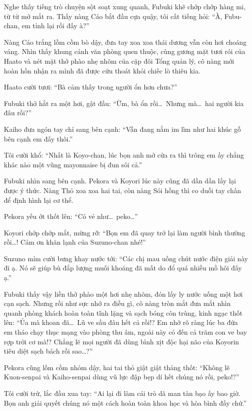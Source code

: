 \documentclass[../main.tex]{subfiles}
\begin{document}
Nghe thấy tiếng trò chuyện sột soạt xung quanh, Fubuki khẽ chớp chớp hàng mi, từ từ mở mắt ra. Thấy nàng Cáo bắt đầu cựa quậy, tôi cất tiếng hỏi: ``À, Fubu-chan, em tỉnh lại rồi đấy à?''

Nàng Cáo trắng lồm cồm bò dậy, đưa tay xoa xoa thái dương vẫn còn hơi choáng váng. Nhìn thấy khung cảnh văn phòng quen thuộc, cùng gương mặt tươi rói của Haato và nét mặt thở phào nhẹ nhõm của cặp đôi Tổng quản lý, cô nàng mới hoàn hồn nhận ra mình đã được cứu thoát khỏi chiếc lò thiêu kia.

Haato cười tươi: ``Bà cảm thấy trong người ổn hơn chưa?''

Fubuki thở hắt ra một hơi, gật đầu: ``Ừm, bà ổn rồi\dots\ Nhưng mà\dots\ hai người kia đâu rồi?''

Kaiho đưa ngón tay chỉ sang bên cạnh: ``Vẫn đang nằm im lìm như hai khúc gỗ bên cạnh em đấy thôi.''

Tôi cười khổ: ``Nhất là Koyo-chan, lúc bọn anh mở cửa ra thì trông em ấy chẳng khác nào một vũng mayonnaise bị đun sôi cả.''

Fubuki nhìn sang bên cạnh. Pekora và Koyori lúc này cũng đã dần dần lấy lại được ý thức. Nàng Thỏ xoa xoa hai tai, còn nàng Sói hồng thì co duỗi tay chân để định hình lại cơ thể.

Pekora yếu ớt thốt lên: ``Có vẻ như\dots\ peko\dots''

Koyori chớp chớp mắt, mừng rỡ: ``Bọn em đã quay trở lại làm người bình thường rồi\dots! Cảm ơn khăn lạnh của Suzuno-chan nhé!''

Suzuno mỉm cười bưng khay nước tới: ``Các chị mau uống chút nước điện giải này đi ạ. Nó sẽ giúp bù đắp lượng muối khoáng đã mất do đổ quá nhiều mồ hôi đấy ạ.''

Fubuki thấy vậy liền thở phào một hơi nhẹ nhõm, đón lấy ly nước uống một hơi cạn sạch. Nhưng rồi như sực nhớ ra điều gì, cô nàng tròn mắt đưa mắt nhìn quanh phòng khách hoàn toàn tĩnh lặng và sạch bóng côn trùng, kinh ngạc thốt lên: ``Ủa mà khoan đã\dots\ Lũ ve sầu đâu hết cả rồi!? Em nhớ rõ ràng lúc ba đứa em tháo chạy thục mạng vào phòng thu âm, ngoài này có đến cả trăm con ve bay rợp trời cơ mà!? Chẳng lẽ mọi người đã dùng bình xịt độc hại não của Koyorin tiêu diệt sạch bách rồi sao\dots?''

Pekora cũng lồm cồm nhỏm dậy, hai tai thỏ giật giật thảng thốt: ``Không lẽ Kuon-senpai và Kaiho-senpai dùng vũ lực đập bẹp dí hết chúng nó rồi, peko!?''

Tôi cười trừ, lắc đầu xua tay: ``Ai lại đi làm cái trò dã man tàn bạo ấy bao giờ. Bọn anh giải quyết chúng nó một cách hoàn toàn khoa học và hòa bình đấy chứ.''
\end{document}
